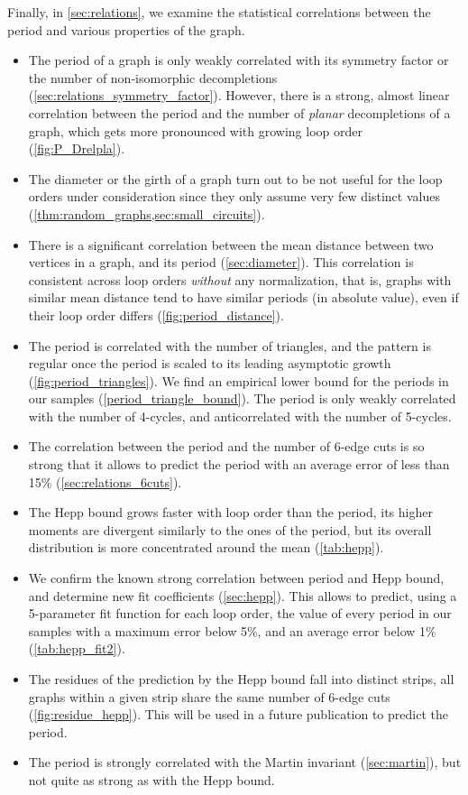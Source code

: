 \documentclass[12pt,a4paper]{article}
\renewcommand{\|}{\rule[-0.4ex]{0.2ex}{1.2em}}
\begin{document}
\noindent
Finally, in \cref{sec:relations}, we examine the statistical correlations between the period and various properties of the graph.
\begin{itemize}
	\item The period of a graph is only weakly correlated with its symmetry factor or the number of non-isomorphic decompletions (\cref{sec:relations_symmetry_factor}). However, there is a strong, almost linear correlation between the period and the number of \emph{planar} decompletions of a graph, which gets more pronounced with growing loop order (\cref{fig:P_Drelpla}).
	\item The diameter or the girth of a graph turn out to be not useful for the loop orders under consideration since they only assume very few distinct values (\cref{thm:random_graphs,sec:small_circuits}).
	\item  There is a significant correlation between the mean distance between two vertices in a graph, and its period (\cref{sec:diameter}). This correlation is consistent across loop orders \emph{without} any normalization, that is, graphs with similar mean distance tend to have similar periods (in absolute value), even if their loop order differs (\cref{fig:period_distance}).
	\item The period is correlated with the number of triangles, and the pattern is regular once the period is scaled to its leading asymptotic growth (\cref{fig:period_triangles}). We find an empirical lower bound for the periods in our samples (\cref{period_triangle_bound}). The period is only weakly correlated with the number of 4-cycles, and anticorrelated with the number of 5-cycles. 
	\item The correlation between the period and the number of 6-edge cuts is so strong that it allows to predict the period with an average error of less than 15\% (\cref{sec:relations_6cuts}).
	\item The Hepp bound grows faster with loop order than the period,  its higher moments are divergent similarly to the ones of the period, but its overall distribution is more concentrated around the mean (\cref{tab:hepp}).
	\item We confirm the known strong correlation between period and Hepp bound, and determine new fit coefficients (\cref{sec:hepp}). This allows to predict, using a 5-parameter fit function for each loop order, the value of every period in our samples with a maximum error below 5\%, and an average error below 1\% (\cref{tab:hepp_fit2}). 
	\item The residues of the prediction by the Hepp bound fall into distinct strips, all graphs within a given strip share the same number of 6-edge cuts (\cref{fig:residue_hepp}). This will be used in a future publication to predict the period.
	\item The period is strongly correlated with the Martin invariant (\cref{sec:martin}), but not quite as strong as with the Hepp bound.
\end{itemize}
\end{document}
